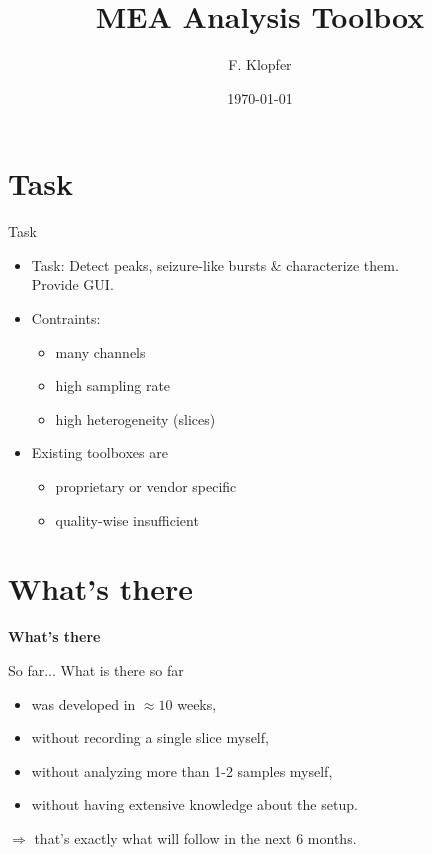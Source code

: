 \documentclass[10pt]{beamer}
\title{\textbf{MEA Analysis Toolbox}}
\author{\vspace{-0.7cm}F. Klopfer}
\date{\today}
\begin{document}
\frame{\titlepage}
\section{Task}
\begin{frame}{Task}
\begin{itemize}
 \item Task: Detect peaks, seizure-like bursts \& characterize them. \\
    Provide GUI. \\ [1em]
 \item Contraints: \begin{itemize}
                    \item many channels \\ [1em]
                    \item high sampling rate \\ [1em]
                    \item high heterogeneity (slices) \\ [2em]
                   \end{itemize}
  \item Existing toolboxes are
  \begin{itemize}
   \item proprietary or vendor specific
   \item quality-wise insufficient
  \end{itemize}
\end{itemize}
\end{frame}

\section{What's there}
\begin{frame}
\begin{center}
 \begin{Huge}
  \textbf{What's there}
 \end{Huge}
 \end{center}
\end{frame}

\begin{frame}{So far...}
  What is there so far  \vspace{0.5em}
  \begin{itemize}
    \item was developed in $\approx10$ weeks, \\ [1em]
    \item without recording a single slice myself, \\ [1em]
    \item without analyzing more than 1-2 samples myself, \\ [1em]
    \item without having extensive knowledge about the setup. \\ [2em]
  \end{itemize}
  $\Rightarrow$ that's exactly what will follow in the next 6 months.
\end{frame}
\end{document}
